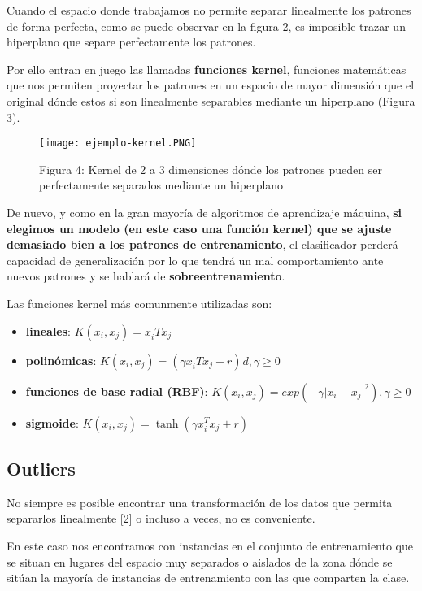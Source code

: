 \documentclass[11pt]{article}
\makeatletter
\def\maxwidth{\ifdim\Gin@nat@width>\linewidth\linewidth
    \else\Gin@nat@width\fi}
\let\Oldincludegraphics\includegraphics
\renewcommand{\includegraphics}[1]{\Oldincludegraphics[width=.8\maxwidth]{#1}}
\providecommand{\tightlist}{%
      \setlength{\itemsep}{0pt}\setlength{\parskip}{0pt}}
\makeatother
\begin{document}
Cuando el espacio donde trabajamos no permite separar linealmente los
patrones de forma perfecta, como se puede observar en la figura 2, es
imposible trazar un hiperplano que separe perfectamente los patrones.

Por ello entran en juego las llamadas \textbf{funciones kernel},
funciones matemáticas que nos permiten proyectar los patrones en un
espacio de mayor dimensión que el original dónde estos si son
linealmente separables mediante un hiperplano (Figura 3).

\begin{figure}[h]
\centering
\texttt{[image: ejemplo-kernel.PNG]}
\caption{Figura 4: Kernel de 2 a 3 dimensiones dónde los patrones pueden
ser perfectamente separados mediante un hiperplano}
\end{figure}

De nuevo, y como en la gran mayoría de algoritmos de aprendizaje
máquina, \textbf{si elegimos un modelo (en este caso una función kernel)
que se ajuste demasiado bien a los patrones de entrenamiento}, el
clasificador perderá capacidad de generalización por lo que tendrá un
mal comportamiento ante nuevos patrones y se hablará de
\textbf{sobreentrenamiento}.

Las funciones kernel más comunmente utilizadas son:

\begin{itemize}
\tightlist
\item
  \textbf{lineales}:  
  $
  K(x_i,x_j) = x_i^{}T x_j 
  $
\item
  \textbf{polinómicas}:  
  $
  K(x_i,x_j) = (\gamma x_i^{}T x_j  +r)^{}d, \gamma \ge 0 $
\item
  \textbf{funciones de base radial (RBF)}:  
  $
  K(x_i,x_j) =
  exp(-\gamma \lvert x_i - x_j \lvert ^2), \gamma \ge 0
  $
\item
  \textbf{sigmoide}:  
  $
  K(x_i,x_j) = \tanh(\gamma x_i^T x_j +r)
  $
  
\end{itemize}

\subsection{Outliers}\label{outliers}

No siempre es posible encontrar una transformación de los datos que
permita separarlos linealmente {[}2{]} o incluso a veces, no es
conveniente.

En este caso nos encontramos con instancias en el conjunto de
entrenamiento que se situan en lugares del espacio muy separados o
aislados de la zona dónde se sitúan la mayoría de instancias de
entrenamiento con las que comparten la clase.
\end{document}
